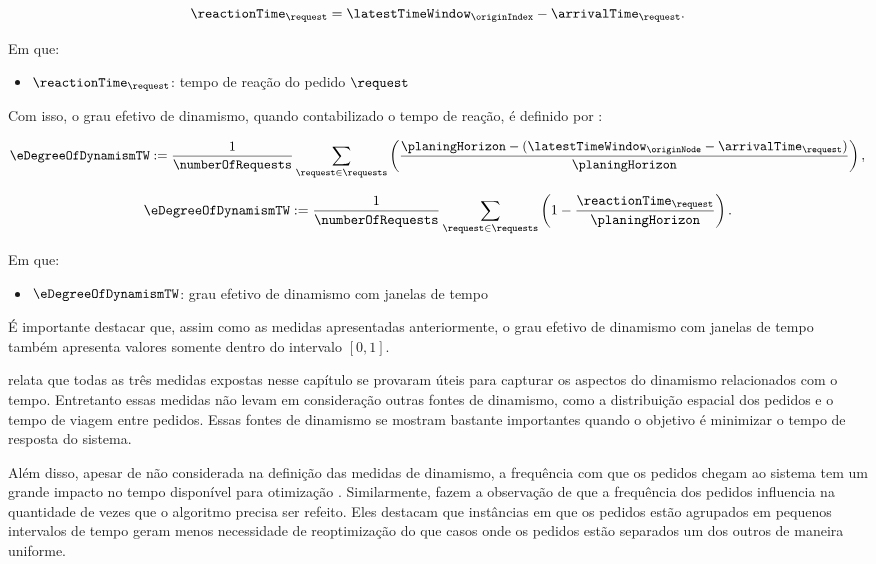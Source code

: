 \begin{equation}
  \reactionTime_\request = \latestTimeWindow_{\originIndex}
                           - \arrivalTime_\request.
\end{equation}

Em que:
\begin{itemize}
  \item $\reactionTime_\request$: tempo de reação do pedido $\request$
\end{itemize}

Com isso, o grau efetivo de dinamismo, quando contabilizado o tempo de reação,
é definido por :


\begin{equation}
  \eDegreeOfDynamismTW := 
  \frac{1}{\numberOfRequests}
  \sum_{\request \in \requests}
  {
    \left(
    \frac{\planingHorizon - (\latestTimeWindow_\originNode
                             - \arrivalTime_\request)}
         {\planingHorizon}
    \right),
  }
\end{equation}

\begin{equation}
  \eDegreeOfDynamismTW := 
  \frac{1}{\numberOfRequests}
  \sum_{\request \in \requests}
  {
    \left(
      1 - \frac{\reactionTime_\request}{\planingHorizon}
    \right).
  }
\end{equation}

Em que:
\begin{itemize}
  \item $\eDegreeOfDynamismTW$: grau efetivo de dinamismo com janelas de tempo
\end{itemize}

É importante destacar que, assim como as medidas apresentadas anteriormente, o
grau efetivo de dinamismo com janelas de tempo também apresenta valores somente
dentro do intervalo $[0, 1]$.

 relata que todas as três medidas expostas nesse
capítulo se provaram úteis para capturar os aspectos do dinamismo relacionados
com o tempo.
Entretanto essas medidas não levam em consideração outras fontes de dinamismo,
como a distribuição espacial dos pedidos e o tempo de viagem entre pedidos.
Essas fontes de dinamismo se mostram bastante importantes quando o objetivo é
minimizar o tempo de resposta do sistema.

Além disso, apesar de não considerada na definição das medidas de dinamismo, a
frequência com que os pedidos chegam ao sistema tem um grande impacto no tempo
disponível para otimização \cite{pillac_review_2013}.
Similarmente,  fazem a observação de que a
frequência dos pedidos influencia na quantidade de vezes que o algoritmo
precisa ser refeito.
Eles destacam que instâncias em que os pedidos estão agrupados em
pequenos intervalos de tempo geram menos necessidade de reoptimização do que
casos onde os pedidos estão separados um dos outros de maneira uniforme.

